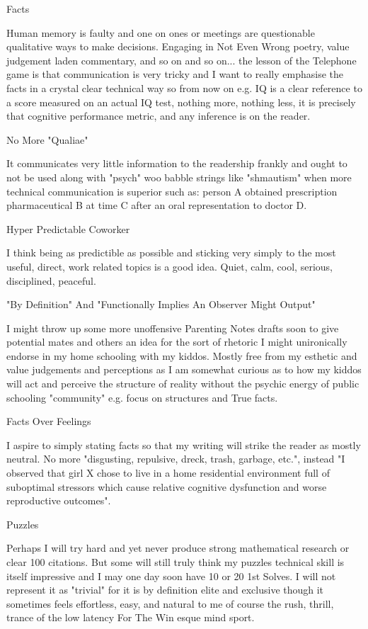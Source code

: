 	Facts

Human memory is faulty and one on ones or meetings are questionable qualitative ways to make decisions. Engaging in Not Even Wrong poetry, value judgement laden commentary, and so on and so on... the lesson of the Telephone game is that communication is very tricky and I want to really emphasise the facts in a crystal clear technical way so from now on e.g. IQ is a clear reference to a score measured on an actual IQ test, nothing more, nothing less, it is precisely that cognitive performance metric, and any inference is on the reader.

	No More "Qualiae"

It communicates very little information to the readership frankly and ought to not be used along with "psych" woo babble strings like "shmautism" when more technical communication is superior such as: person A obtained prescription pharmaceutical B at time C after an oral representation to doctor D.

	Hyper Predictable Coworker

I think being as predictible as possible and sticking very simply to the most useful, direct, work related topics is a good idea. Quiet, calm, cool, serious, disciplined, peaceful.

	"By Definition" And "Functionally Implies An Observer Might Output"

I might throw up some more unoffensive Parenting Notes drafts soon to give potential mates and others an idea for the sort of rhetoric I might unironically endorse in my home schooling with my kiddos. Mostly free from my esthetic and value judgements and perceptions as I am somewhat curious as to how my kiddos will act and perceive the structure of reality without the psychic energy of public schooling "community" e.g. focus on structures and True facts.

	Facts Over Feelings

I aspire to simply stating facts so that my writing will strike the reader as mostly neutral. No more "disgusting, repulsive, dreck, trash, garbage, etc.", instead "I observed that girl X chose to live in a home residential environment full of suboptimal stressors which cause relative cognitive dysfunction and worse reproductive outcomes".

	Puzzles

Perhaps I will try hard and yet never produce strong mathematical research or clear 100 citations. But some will still truly think my puzzles technical skill is itself impressive and I may one day soon have 10 or 20 1st Solves. I will not represent it as "trivial" for it is by definition elite and exclusive though it sometimes feels effortless, easy, and natural to me of course the rush, thrill, trance of the low latency For The Win esque mind sport.

